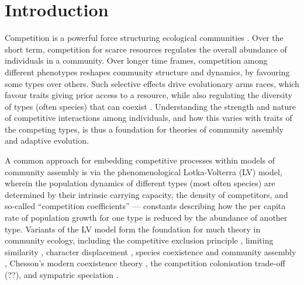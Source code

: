 \documentclass[a4paper,11pt]{article}
\begin{document}
\section{Introduction}

Competition is a powerful force structuring ecological communities \citep{Schluter-2000,Vellend-2016}. Over the short term, competition for scarce resources regulates the overall abundance of individuals in a community. Over longer time frames, competition among different phenotypes reshapes community structure and dynamics, by favouring some types over others. Such selective effects drive evolutionary arms races, which favour traits giving prior access to a resource, while also regulating the diversity of types (often species) that can coexist \citep[e.g.][]{Gause-1934,Lack-1947,MacArthur-1967}. Understanding the strength and nature of competitive interactions among individuals, and how this varies with traits of the competing types, is thus a foundation for theories of community assembly and adaptive evolution.

A common approach for embedding competitive processes within models of community assembly is via the phenomenological Lotka-Volterra (LV) model, wherein the  population dynamics of different types (most often species) are determined by their intrinsic carrying capacity, the density of competitors, and so-called ``competition coefficients'' \citep{Lotka-1925, Volterra-1926} --- constants describing how the per capita rate of population growth for one type is reduced by the abundance of another type. Variants of the LV model form the foundation for much theory in community ecology, including the competitive exclusion principle \citep{Gause-1934}, limiting similarity \citep{MacArthur-1967, May-1972, Slatkin-1980}, character displacement \citep{Taper-1985, Case-2000}, species coexistence and community assembly \citep{MacArthur-1967, Calcagno-2006, Leimar-2013}, Chesson's modern coexistence theory \citep{Chesson-2000,Barabas-2018}, the competition colonisation trade-off (??), and sympatric speciation \citep{Dieckmann-1999}.
\end{document}
